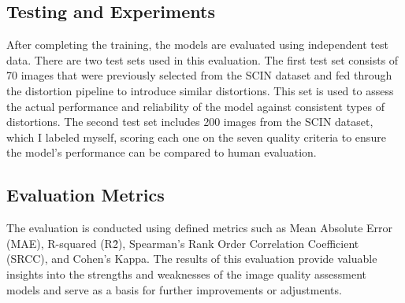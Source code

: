 \subsection{Testing and Experiments}
\label{sub:TestExperiment}
After completing the training, the models are evaluated using independent test data. There are two test sets used in this evaluation. The first test set consists of 70 images that were previously selected from the SCIN dataset and fed through the distortion pipeline to introduce similar distortions. This set is used to assess the actual performance and reliability of the model against consistent types of distortions. The second test set includes 200 images from the SCIN dataset, which I labeled myself, scoring each one on the seven quality criteria to ensure the model’s performance can be compared to human evaluation. \par 

\subsection{Evaluation Metrics}
\label{sub:EvaluationMetrics}
The evaluation is conducted using defined metrics such as Mean Absolute Error (MAE), R-squared (R\^2), Spearman’s Rank Order Correlation Coefficient (SRCC), and Cohen’s Kappa. The results of this evaluation provide valuable insights into the strengths and weaknesses of the image quality assessment models and serve as a basis for further improvements or adjustments. \par {}

